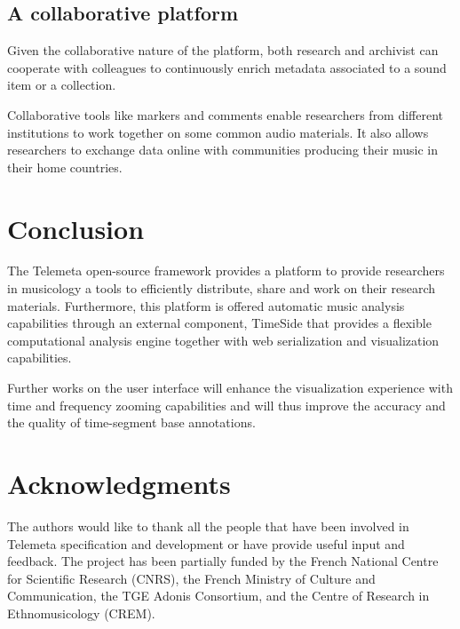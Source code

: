 \documentclass{paper}
\begin{document}
\subsection{A collaborative platform}
Given the collaborative nature of the platform, both research and archivist can cooperate with colleagues to continuously enrich metadata associated to a sound item or a collection.  

Collaborative tools like markers and comments enable researchers from different institutions to work together on some common audio materials.
It also allows researchers to exchange data online with communities producing their music in their home countries.





\section{Conclusion}

The Telemeta open-source framework provides a platform to provide researchers in musicology a tools to efficiently distribute, share and work on their research materials. Furthermore, this platform is offered automatic music analysis capabilities through an external component, TimeSide that provides a flexible computational analysis engine together with web serialization and visualization capabilities.

Further works on the user interface will enhance the visualization experience with time and frequency zooming capabilities and will thus improve the accuracy and the quality of time-segment base annotations.



\section*{Acknowledgments} 
{\small The authors would like to thank all the people that have been involved in Telemeta specification and development or have provide useful input and feedback. 
The project has been partially funded by the French National Centre for Scientific Research (CNRS), the French Ministry of Culture and Communication, the TGE Adonis Consortium, and the Centre of Research in Ethnomusicology (CREM).}


%

\end{document}
